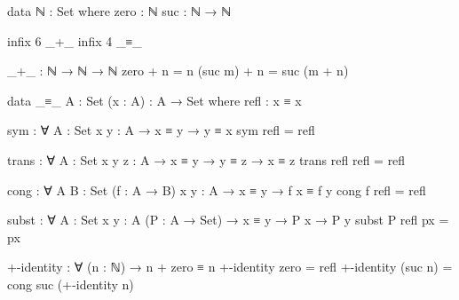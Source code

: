\documentclass{article}
\begin{document}
\begin{prev}
\begin{code}
data ℕ : Set where
  zero : ℕ
  suc  : ℕ → ℕ


infix 6 _+_
infix 4 _≡_

_+_ : ℕ → ℕ → ℕ
zero + n = n
(suc m) + n = suc (m + n)

data _≡_ {A : Set} (x : A) : A → Set where
  refl : x ≡ x

sym : ∀ {A : Set} {x y : A} → x ≡ y → y ≡ x
sym refl = refl

trans : ∀ {A : Set} {x y z : A} → x ≡ y → y ≡ z → x ≡ z
trans refl refl = refl

cong : ∀ {A B : Set} (f : A → B) {x y : A} → x ≡ y → f x ≡ f y
cong f refl = refl

subst : ∀ {A : Set} {x y : A} (P : A → Set) → x ≡ y → P x → P y
subst P refl px = px

+-identity : ∀ (n : ℕ) → n + zero ≡ n
+-identity zero = refl
+-identity (suc n) = cong suc (+-identity n)
\end{code}
\end{prev}
\end{document}
